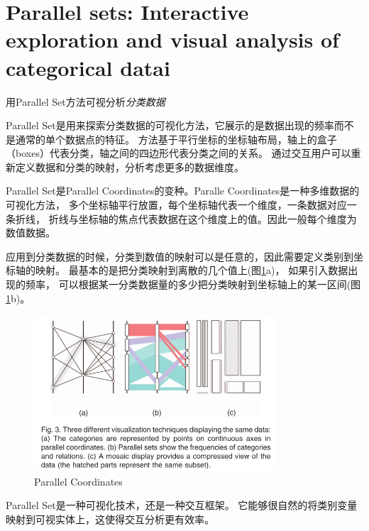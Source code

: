 \documentclass{article}
\begin{document}
\section{Parallel sets: Interactive exploration and
	visual analysis of categorical datai\cite{kosara2006parallel}}

	用Parallel Set方法可视分析\emph{分类数据}

	Parallel Set是用来探索分类数据的可视化方法，它展示的是数据出现的频率而不是通常的单个数据点的特征。
	方法基于平行坐标的坐标轴布局，轴上的盒子（boxes）代表分类，轴之间的四边形代表分类之间的关系。
	通过交互用户可以重新定义数据和分类的映射，分析考虑更多的数据维度。

	Parallel Set是Parallel Coordinates的变种。Paralle Coordinates是一种多维数据的可视化方法，
	多个坐标轴平行放置，每个坐标轴代表一个维度，一条数据对应一条折线，
	折线与坐标轴的焦点代表数据在这个维度上的值。因此一般每个维度为数值数据。

	应用到分类数据的时候，分类到数值的映射可以是任意的，因此需要定义类别到坐标轴的映射。
	最基本的是把分类映射到离散的几个值上(图\ref{fig:parallelcoordinates1}a)，
	如果引入数据出现的频率，
	可以根据某一分类数据量的多少把分类映射到坐标轴上的某一区间(图\ref{fig:parallelcoordinates1}b)。
	\begin{figure}[h]
		\centering
		\includegraphics[width=0.8\textwidth]{"_img/Parallel_Coordinates_1.png"}
		\caption{Parallel Coordinates}
		\label{fig:parallelcoordinates1}
	\end{figure}

	Parallel Set是一种可视化技术，还是一种交互框架。
	它能够很自然的将类别变量映射到可视实体上，这使得交互分析更有效率。
\end{document}
